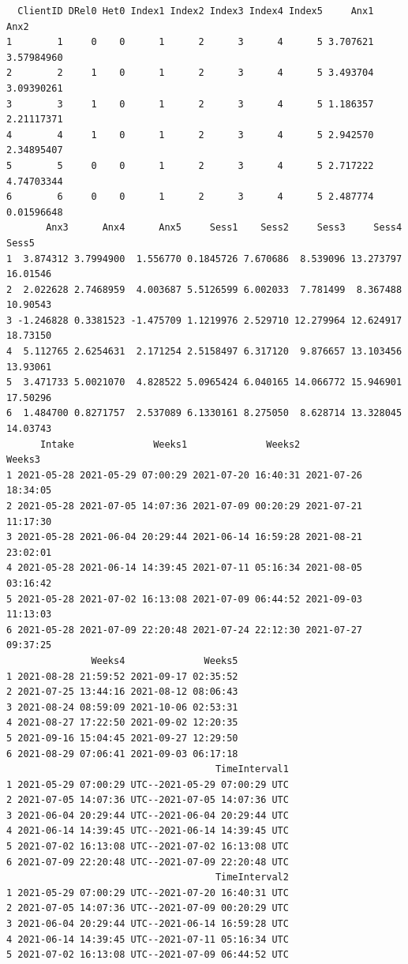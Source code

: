 \documentclass[
  11pt,
]{book}
\begin{document}
\begin{verbatim}
  ClientID DRel0 Het0 Index1 Index2 Index3 Index4 Index5     Anx1       Anx2
1        1     0    0      1      2      3      4      5 3.707621 3.57984960
2        2     1    0      1      2      3      4      5 3.493704 3.09390261
3        3     1    0      1      2      3      4      5 1.186357 2.21117371
4        4     1    0      1      2      3      4      5 2.942570 2.34895407
5        5     0    0      1      2      3      4      5 2.717222 4.74703344
6        6     0    0      1      2      3      4      5 2.487774 0.01596648
       Anx3      Anx4      Anx5     Sess1    Sess2     Sess3     Sess4    Sess5
1  3.874312 3.7994900  1.556770 0.1845726 7.670686  8.539096 13.273797 16.01546
2  2.022628 2.7468959  4.003687 5.5126599 6.002033  7.781499  8.367488 10.90543
3 -1.246828 0.3381523 -1.475709 1.1219976 2.529710 12.279964 12.624917 18.73150
4  5.112765 2.6254631  2.171254 2.5158497 6.317120  9.876657 13.103456 13.93061
5  3.471733 5.0021070  4.828522 5.0965424 6.040165 14.066772 15.946901 17.50296
6  1.484700 0.8271757  2.537089 6.1330161 8.275050  8.628714 13.328045 14.03743
      Intake              Weeks1              Weeks2              Weeks3
1 2021-05-28 2021-05-29 07:00:29 2021-07-20 16:40:31 2021-07-26 18:34:05
2 2021-05-28 2021-07-05 14:07:36 2021-07-09 00:20:29 2021-07-21 11:17:30
3 2021-05-28 2021-06-04 20:29:44 2021-06-14 16:59:28 2021-08-21 23:02:01
4 2021-05-28 2021-06-14 14:39:45 2021-07-11 05:16:34 2021-08-05 03:16:42
5 2021-05-28 2021-07-02 16:13:08 2021-07-09 06:44:52 2021-09-03 11:13:03
6 2021-05-28 2021-07-09 22:20:48 2021-07-24 22:12:30 2021-07-27 09:37:25
               Weeks4              Weeks5
1 2021-08-28 21:59:52 2021-09-17 02:35:52
2 2021-07-25 13:44:16 2021-08-12 08:06:43
3 2021-08-24 08:59:09 2021-10-06 02:53:31
4 2021-08-27 17:22:50 2021-09-02 12:20:35
5 2021-09-16 15:04:45 2021-09-27 12:29:50
6 2021-08-29 07:06:41 2021-09-03 06:17:18
                                     TimeInterval1
1 2021-05-29 07:00:29 UTC--2021-05-29 07:00:29 UTC
2 2021-07-05 14:07:36 UTC--2021-07-05 14:07:36 UTC
3 2021-06-04 20:29:44 UTC--2021-06-04 20:29:44 UTC
4 2021-06-14 14:39:45 UTC--2021-06-14 14:39:45 UTC
5 2021-07-02 16:13:08 UTC--2021-07-02 16:13:08 UTC
6 2021-07-09 22:20:48 UTC--2021-07-09 22:20:48 UTC
                                     TimeInterval2
1 2021-05-29 07:00:29 UTC--2021-07-20 16:40:31 UTC
2 2021-07-05 14:07:36 UTC--2021-07-09 00:20:29 UTC
3 2021-06-04 20:29:44 UTC--2021-06-14 16:59:28 UTC
4 2021-06-14 14:39:45 UTC--2021-07-11 05:16:34 UTC
5 2021-07-02 16:13:08 UTC--2021-07-09 06:44:52 UTC

\end{verbatim}
\end{document}
